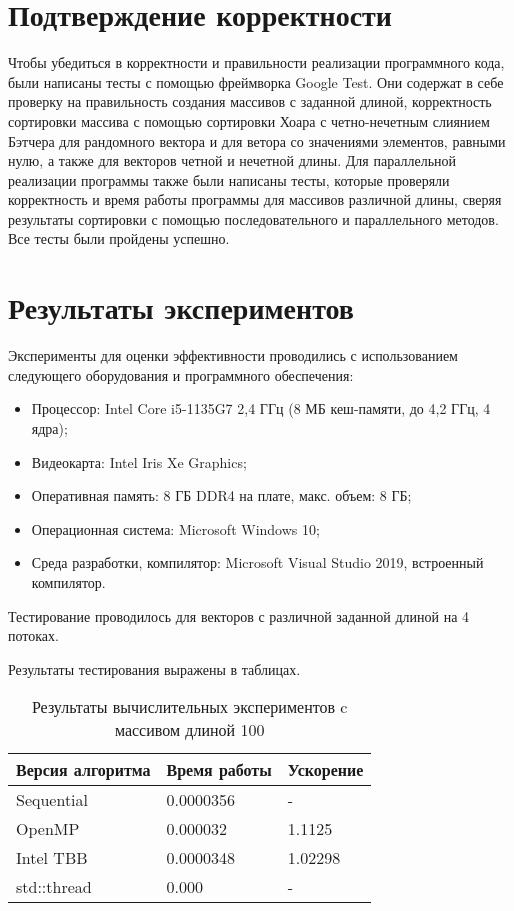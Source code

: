 \documentclass{report}
\begin{document}
\section*{Подтверждение корректности}
Чтобы убедиться в корректности и правильности реализации программного кода, были написаны тесты с помощью фреймворка Google Test. Они содержат в себе проверку на правильность создания массивов с заданной длиной, корректность сортировки массива с помощью сортировки Хоара с четно-нечетным слиянием Бэтчера для рандомного вектора и для ветора со значениями элементов, равными нулю, а также для векторов четной и нечетной длины. Для параллельной реализации программы также были написаны тесты, которые проверяли корректность и время работы программы для массивов различной длины, сверяя результаты сортировки с помощью последовательного и параллельного методов. Все тесты были пройдены успешно. 
\newpage

\section*{Результаты экспериментов}
\par Эксперименты для оценки эффективности проводились с использованием следующего оборудования и программного обеспечения:
\begin{itemize}
\item Процессор: Intel Core i5-1135G7 2,4 ГГц (8 МБ кеш-памяти, до 4,2 ГГц, 4 ядра);
\item Видеокарта: Intel Iris Xe Graphics;
\item Оперативная память: 8 ГБ DDR4 на плате, макс. объем: 8 ГБ;
\item Операционная система: Microsoft Windows 10;
\item Среда разработки, компилятор: Microsoft Visual Studio 2019, встроенный компилятор.
\end{itemize}
\par Тестирование проводилось для векторов с различной заданной длиной на 4 потоках.
\par Результаты тестирования выражены в таблицах.

\begin{table}[!h]
\caption{Результаты вычислительных экспериментов c массивом длиной 100}
\centering
\begin{tabular}{| p{5cm} | p{5cm} | p{5cm} |}
\hline
Версия алгоритма & Время работы & Ускорение  \\[5pt]
\hline
Sequential      & 0.0000356       & -             \\
OpenMP          & 0.000032        & 1.1125        \\
Intel TBB       & 0.0000348       & 1.02298       \\
std::thread     & 0.000           & -             \\
\hline
\end{tabular}
\end{table}
\end{document}
